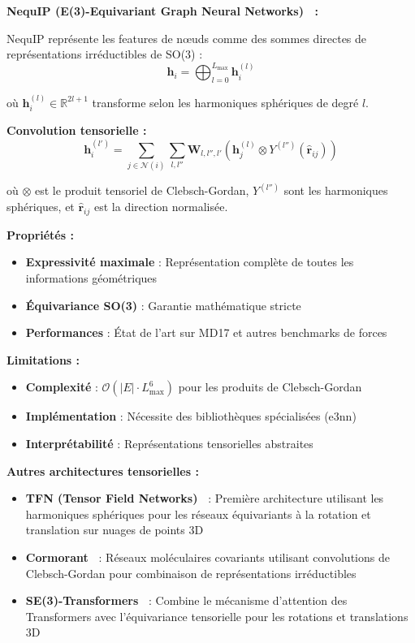 \textbf{NequIP (E(3)-Equivariant Graph Neural Networks)~\cite{Batzner2022} :}

NequIP représente les features de nœuds comme des sommes directes de représentations irréductibles de SO(3) :
\[
\mathbf{h}_i = \bigoplus_{l=0}^{L_{\max}} \mathbf{h}_i^{(l)}
\]

où $\mathbf{h}_i^{(l)} \in \mathbb{R}^{2l+1}$ transforme selon les harmoniques sphériques de degré $l$.

\textbf{Convolution tensorielle :}
\[
\mathbf{h}_i^{(l')} = \sum_{j \in \mathcal{N}(i)} \sum_{l, l''} \mathbf{W}_{l,l'',l'} \left(\mathbf{h}_j^{(l)} \otimes Y^{(l'')}(\hat{\mathbf{r}}_{ij})\right)
\]

où $\otimes$ est le produit tensoriel de Clebsch-Gordan, $Y^{(l'')}$ sont les harmoniques sphériques, et $\hat{\mathbf{r}}_{ij}$ est la direction normalisée.

\textbf{Propriétés :}
\begin{itemize}
    \item \textbf{Expressivité maximale} : Représentation complète de toutes les informations géométriques
    \item \textbf{Équivariance SO(3)} : Garantie mathématique stricte
    \item \textbf{Performances} : État de l'art sur MD17 et autres benchmarks de forces
\end{itemize}

\textbf{Limitations :}
\begin{itemize}
    \item \textbf{Complexité} : $\mathcal{O}(|E| \cdot L_{\max}^6)$ pour les produits de Clebsch-Gordan
    \item \textbf{Implémentation} : Nécessite des bibliothèques spécialisées (e3nn)
    \item \textbf{Interprétabilité} : Représentations tensorielles abstraites
\end{itemize}

\textbf{Autres architectures tensorielles :}
\begin{itemize}
    \item \textbf{TFN (Tensor Field Networks)~\cite{Thomas2018}} : Première architecture utilisant les harmoniques sphériques pour les réseaux équivariants à la rotation et translation sur nuages de points 3D
    \item \textbf{Cormorant~\cite{Anderson2019}} : Réseaux moléculaires covariants utilisant convolutions de Clebsch-Gordan pour combinaison de représentations irréductibles
    \item \textbf{SE(3)-Transformers~\cite{Fuchs2020}} : Combine le mécanisme d'attention des Transformers avec l'équivariance tensorielle pour les rotations et translations 3D
\end{itemize}

